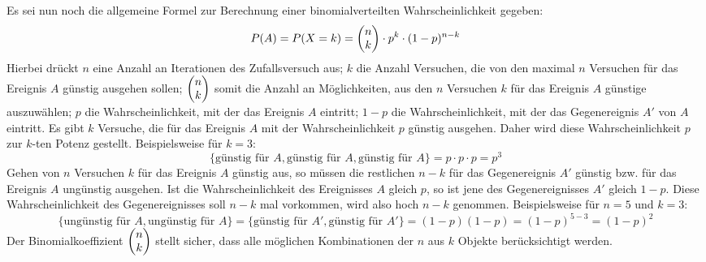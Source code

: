 Es sei nun noch die allgemeine Formel zur Berechnung einer binomialverteilten Wahrscheinlichkeit gegeben: $$P(A) = P(X=k) = \begin{pmatrix}n \\ k\end{pmatrix} \cdot p^k \cdot (1-p)^{n-k}$$ Hierbei dr\"{u}ckt $n$ eine Anzahl an Iterationen des Zufallsversuch aus; $k$ die Anzahl Versuchen, die von den maximal $n$ Versuchen f\"{u}r das Ereignis $A$ g\"{u}nstig ausgehen sollen; $\begin{pmatrix}n \\ k\end{pmatrix}$ somit die Anzahl an M\"{o}glichkeiten, aus den $n$ Versuchen $k$ f\"{u}r das Ereignis $A$ g\"{u}nstige auszuw\"{a}hlen; $p$ die Wahrscheinlichkeit, mit der das Ereignis $A$ eintritt; $1-p$ die Wahrscheinlichkeit, mit der das Gegenereignis $A'$ von $A$ eintritt. Es gibt $k$ Versuche, die f\"{u}r das Ereignis $A$ mit der Wahrscheinlichkeit $p$ g\"{u}nstig ausgehen. Daher wird diese Wahrscheinlichkeit $p$ zur $k$-ten Potenz gestellt. Beispielsweise f\"{u}r $k=3$: $$\{\text{g\"{u}nstig f\"{u}r } A, \text{g\"{u}nstig f\"{u}r } A, \text{g\"{u}nstig f\"{u}r } A\} = p \cdot p \cdot p = p^3$$ Gehen von $n$ Versuchen $k$ f\"{u}r das Ereignis $A$ g\"{u}nstig aus, so m\"{u}ssen die restlichen $n-k$ f\"{u}r das Gegenereignis $A'$ g\"{u}nstig bzw. f\"{u}r das Ereignis $A$ ung\"{u}nstig ausgehen. Ist die Wahrscheinlichkeit des Ereignisses $A$ gleich $p$, so ist jene des Gegenereignisses $A'$ gleich $1 - p$. Diese Wahrscheinlichkeit des Gegenereignisses soll $n-k$ mal vorkommen, wird also hoch $n-k$ genommen. Beispielsweise f\"{u}r $n=5$ und $k=3$: $$\{\text{ung\"{u}nstig f\"{u}r } A, \text{ung\"{u}nstig f\"{u}r } A\} = \{\text{g\"{u}nstig f\"{u}r } A', \text{g\"{u}nstig f\"{u}r } A'\} = (1-p) (1-p) = (1-p)^{5-3} = (1-p)^2$$ Der Binomialkoeffizient $\begin{pmatrix}n \\ k\end{pmatrix}$ stellt sicher, dass alle m\"{o}glichen Kombinationen der $n$ aus $k$ Objekte ber\"{u}cksichtigt werden.

